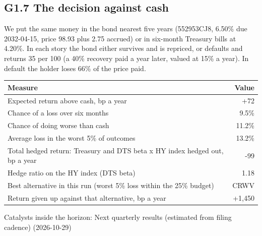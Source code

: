 \documentclass[11pt,a4paper]{article}
\begin{document}
\subsection*{G1.7 The decision against cash}
We put the same money in the bond nearest five years (552953CJ8, 6.50\% due 2032-04-15, price 98.93 plus 2.75 accrued) or in six-month Treasury bills at 4.20\%. In each story the bond either survives and is repriced, or defaults and returns 35 per 100 (a 40\% recovery paid a year later, valued at 15\% a year). In default the holder loses 66\% of the price paid.
\begin{center}\footnotesize\setlength{\tabcolsep}{3.5pt}\begin{tabular}{@{}lr@{}}\toprule
Measure & Value \\\midrule
Expected return above cash, bp a year & +72 \\
Chance of a loss over six months & 9.5\% \\
Chance of doing worse than cash & 11.2\% \\
Average loss in the worst 5\% of outcomes & 13.2\% \\
Total hedged return: Treasury and DTS beta x HY index hedged out, bp a year & -99 \\
Hedge ratio on the HY index (DTS beta) & 1.18 \\
Best alternative in this run (worst 5\% loss within the 25\% budget) & CRWV \\
Return given up against that alternative, bp a year & +1,450 \\
\bottomrule\end{tabular}\end{center}
Catalysts inside the horizon: Next quarterly results (estimated from filing cadence) (2026-10-29)
\end{document}
